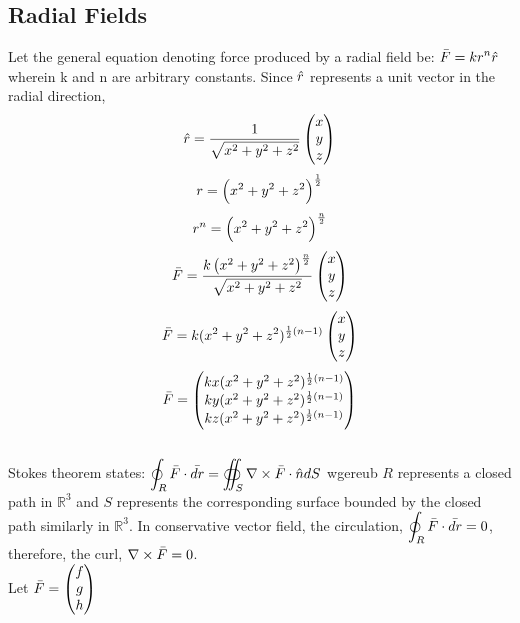 \documentclass[class=report, 12pt, crop=false]{standalone}
\begin{document}
\begin{center}
\chapter{Radial Fields}
\begin{comment}
\end{comment}
\begin{comment}
\end{comment}
Let the general equation denoting force produced by a radial field be: $\displaystyle{\bar{F} = kr^n\hat{r}}$ wherein k and n are arbitrary constants. Since $\displaystyle{\hat{r}}$ represents a unit vector in the radial direction, 
$$\hat{r} = \frac{1}{\sqrt{x^2 + y^2 + z^2}}\begin{pmatrix}x \\ y \\ z \end{pmatrix}$$
$$r = \left(x^2 +y ^2 + z^2\right)^\frac{1}{2}$$
$$r^n = \left(x^2 +y ^2 + z^2\right)^\frac{n}{2}$$
$$\bar{F} = \frac{k\left(x^2 +y ^2 + z^2\right)^\frac{n}{2}}{\sqrt{x^2 + y^2 + z^2}}\begin{pmatrix} x\\y\\z \end{pmatrix}$$
$$\bar{F} = k(x^2 + y^2 + z^2)^{\frac{1}{2}(n-1)}\begin{pmatrix} x\\y\\z \end{pmatrix}$$
$$\bar{F} = \begin{pmatrix} kx(x^2 + y^2 + z^2)^{\frac{1}{2}(n-1)}\\ky(x^2 + y^2 + z^2)^{\frac{1}{2}(n-1)}\\kz(x^2 + y^2 + z^2)^{\frac{1}{2}(n-1)} \end{pmatrix}$$
\\Stokes theorem states: $\displaystyle{\oint_R  \bar{F} \cdot \bar{dr} = \oiint_S \nabla \times \bar{F} \cdot \hat{n}dS}$ wgereub $R$ represents a closed path in $\mathbb{R}^3$ and $S$ represents the corresponding surface bounded by the closed path similarly in $\mathbb{R}^3$. In  conservative vector field, the circulation, $\displaystyle{\oint_R  \bar{F} \cdot \bar{dr}} = 0$, therefore, the curl, $\nabla \times \bar{F} = 0$.
\\Let $\displaystyle{\bar{F} = \begin{pmatrix} f\\g\\h \end{pmatrix}}$

\end{center}
\end{document}
